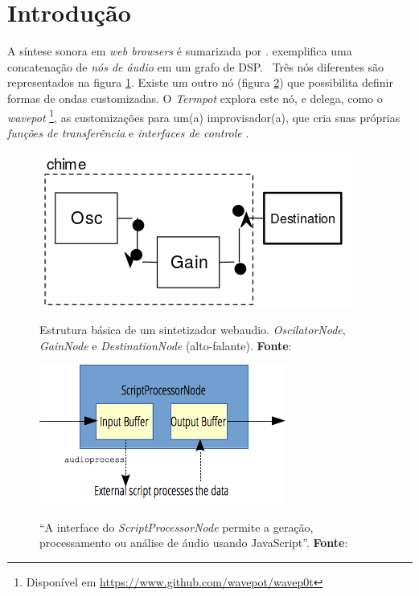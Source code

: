 \section{Introdução}\label{sec:introducao}




A síntese sonora em \emph{web browsers} é sumarizada por \cite{w3c_web_2012,roberts_web_2013-,wyse_viability_2014}.\cite{srikumar_tamming_2013} exemplifica uma concatenação de \emph{nós de áudio} em um grafo de DSP. \ Três nós diferentes são representados na figura \ref{fig:chime}. Existe um outro nó (figura \ref{fig:scriptprocessor}) que possibilita definir formas de ondas customizadas. O \emph{Termpot} explora este nó, e delega, como o \emph{wavepot} \footnote{Disponível em \url{https://www.github.com/wavepot/wavep0t}}, as customizações para um(a) improvisador(a), que cria suas próprias \emph{funções de transferência} e \emph{interfaces de controle} \cite{mathews_groove_1970}.

\begin{figure}[!h]
\centering
\caption{Estrutura básica de um sintetizador webaudio. \emph{OscilatorNode}, \emph{GainNode} e \emph{DestinationNode} (alto-falante). \textbf{Fonte}: \cite{srikumar_tamming_2013}}
\includegraphics[scale=0.3]{chime.png}
\label{fig:chime}  
\end{figure}


\begin{figure}[!h]
\centering
\caption{``A interface do \emph{ScriptProcessorNode} permite a geração, processamento ou análise de áudio usando JavaScript''. \textbf{Fonte}: \cite{w3c_web_2012}}
\includegraphics[scale=0.6]{WebAudioScriptProcessingNode.png}
\label{fig:scriptprocessor} 
\end{figure}


